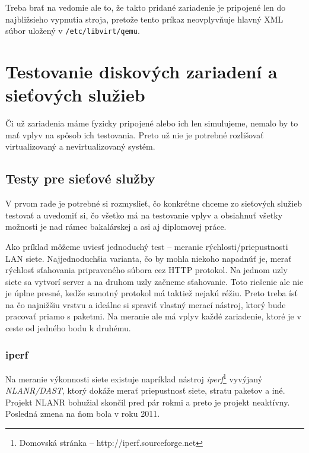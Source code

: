 Treba brať na vedomie ale to, že takto pridané zariadenie je pripojené len do
najbližsieho vypnutia stroja, pretože tento príkaz neovplyvňuje hlavný XML
súbor uložený v \texttt{/etc/libvirt/qemu}.

%
%

\chapter{Testovanie diskových zariadení a sieťových služieb}

Či už zariadenia máme fyzicky pripojené alebo ich len simulujeme, nemalo by to
mať vplyv na spôsob ich testovania. Preto už nie je potrebné rozlišovať
virtualizovaný a nevirtualizovaný systém.

%
%

\section{Testy pre sieťové služby}

V prvom rade je potrebné si rozmyslieť, čo konkrétne chceme zo sieťových
služieb testovať a uvedomiť si, čo všetko má na testovanie vplyv a obsiahnuť
všetky možnosti je nad rámec bakalárskej a asi aj diplomovej práce.

Ako príklad môžeme uviesť jednoduchý test -- meranie rýchlosti/priepustnosti
LAN siete.  Najjednoduchšia varianta, čo by mohla niekoho napadnúť je, merať
rýchlosť sťahovania pripraveného súbora cez HTTP protokol. Na jednom uzly siete
sa vytvorí server a na druhom uzly začneme sťahovanie. Toto riešenie ale nie je
úplne presné, kedže samotný protokol má taktiež nejakú réžiu. Preto treba ísť
na čo najnižšiu vrstvu a ideálne si spraviť vlastný merací nástroj, ktorý bude
pracovať priamo s paketmi. Na meranie ale má vplyv každé zariadenie, ktoré je
v ceste od jedného bodu k druhému.

%
%

\subsection{iperf}

Na meranie výkonnosti siete existuje napríklad nástroj
\emph{iperf}\footnote{Domovská stránka -- http://iperf.sourceforge.net}
vyvýjaný \emph{NLANR/DAST}, ktorý dokáže merať priepustnosť siete, stratu
paketov a iné.  Projekt NLANR bohužial skončil pred pár rokmi a preto je
projekt neaktívny.  Posledná zmena na ňom bola v roku 2011.

